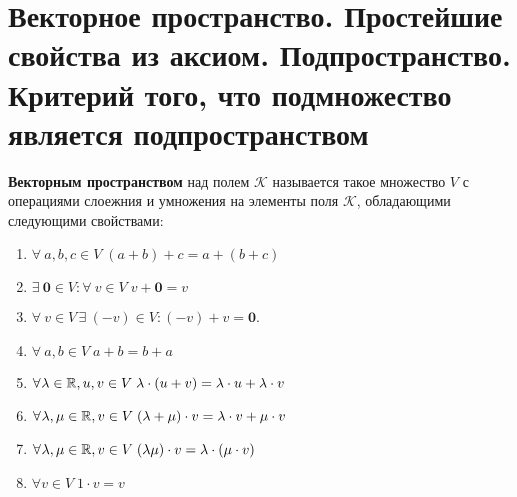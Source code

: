 \section{Векторное пространство. Простейшие свойства из аксиом. Подпространство. Критерий того, что подмножество является подпространством}

\begin{definition}
    \textbf{Векторным пространством} над полем $\mathcal{K}$ называется такое множество $V$ с операциями слоежния и умножения на элементы поля $\mathcal{K}$, обладающими следующими свойствами:
    \begin{enumerate}
            \item $\forall\!\:a, b, c \in V\;(a + b) + c = a + (b + c)$
            \item $\exists\!\:\boldsymbol{0} \in V : \forall\!\:v \in V\;v + \boldsymbol{0} = v$
            \item $\forall\!\:v \in V\,\exists\!\:(-v) \in V: (-v) + v = \boldsymbol{0}$.\quad{}
            \item $\forall\!\: a, b \in V\;a + b = b + a$
            \item $\forall\!\: \lambda \in \mathbb{R}, u, v \in V\; \lambda \cdot (u + v) = \lambda \cdot u + \lambda \cdot v$
            \item $\forall\!\: \lambda, \mu \in \mathbb{R}, v \in V\; (\lambda + \mu) \cdot v = \lambda \cdot v + \mu \cdot v$
            \item $\forall\!\: \lambda, \mu \in \mathbb{R}, v \in V\; (\lambda\mu) \cdot v = \lambda \cdot (\mu \cdot v)$
            \item $\forall v \in V\;1 \cdot v = v$
    \end{enumerate}
\end{definition}

